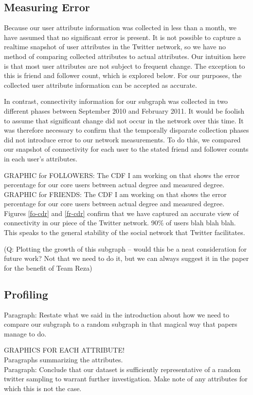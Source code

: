 \subsection{Measuring Error}

Because our user attribute information was collected in less than a month, we have assumed that no significant error is present.  It is not possible to capture a realtime snapshot of user attributes in the Twitter network, so we have no method of comparing collected attributes to actual attributes.  Our intuition here is that most user attributes are not subject to frequent change.  The exception to this is friend and follower count, which is explored below.  For our purposes, the collected user attribute information can be accepted as accurate.

In contrast, connectivity information for our subgraph was collected in two different phases between September 2010 and February 2011.  It would be foolish to assume that significant change did not occur in the network over this time.  It was therefore necessary to confirm that the temporally disparate collection phases did not introduce error to our network measurements.  To do this, we compared our snapshot of connectivity for each user to the stated friend and follower counts in each user's attributes.

GRAPHIC for FOLLOWERS: The CDF I am working on that shows the error percentage for our core users between actual degree and measured degree.\\

GRAPHIC for FRIENDS: The CDF I am working on that shows the error percentage for our core users between actual degree and measured degree.\\

Figures \ref{fo-cdr} and \ref{fr-cdr} confirm that we have captured an accurate view of connectivity in our piece of the Twitter network.  90\% of users blah blah blah.  This speaks to the general stability of the social network that Twitter facilitates.

(Q: Plotting the growth of this subgraph -- would this be a neat consideration for future work?  Not that we need to do it, but we can always suggest it in the paper for the benefit of Team Reza)\\

\subsection{Profiling}

Paragraph: Restate what we said in the introduction about how we need to compare our subgraph to a random subgraph in that magical way that papers manage to do.

GRAPHICS FOR EACH ATTRIBUTE!\\

Paragraphs summarizing the attributes.\\

Paragraph: Conclude that our dataset is sufficiently representative of a random twitter sampling to warrant further investigation.  Make note of any attributes for which this is not the case.\\

